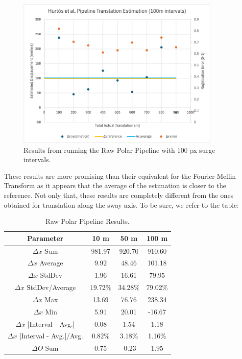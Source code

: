 \begin{figure}[H]
  \centering
  \includegraphics[width=0.9\textwidth]{figures/results/Translation-Surge/PC-9.png}
  \caption{Results from running the Raw Polar Pipeline with 100 px surge intervals.}
\end{figure}


These results are more promising than their equivalent for the Fourier-Mellin Transform as it appears that the average of the estimation is closer to the reference. Not only that, these results are completely different from the ones obtained for translation along the sway axis. To be sure, we refer to the table:

\begin{table}[H]
    \centering
    \begin{tabular}{|c|c|c|c|}
        \hline
        \textbf{Parameter} & \textbf{10 m} & \textbf{50 m} & \textbf{100 m} \\ \hline
        \(\Delta x\) Sum & 981.97 & 920.70 & 910.60 \\ \hline
        \(\Delta x\) Average & 9.92 & 48.46 & 101.18 \\ \hline
        \(\Delta x\) StdDev & 1.96 & 16.61 & 79.95 \\ \hline
        \(\Delta x\) StdDev/Average & 19.72\% & 34.28\% & 79.02\% \\ \hline
        \(\Delta x\) Max & 13.69 & 76.76 & 238.34 \\ \hline
        \(\Delta x\) Min & 5.91 & 20.01 & -16.67 \\ \hline
        \(\Delta x\) |Interval - Avg.| & 0.08 & 1.54 & 1.18 \\ \hline
        \(\Delta x\) |Interval - Avg.|/Avg. & 0.82\% & 3.18\% & 1.16\% \\ \hline
        \(\Delta\Theta\) Sum & 0.75 & -0.23 & 1.95 \\ \hline
    \end{tabular}
    \caption{Raw Polar Pipeline Results.}
\end{table}

